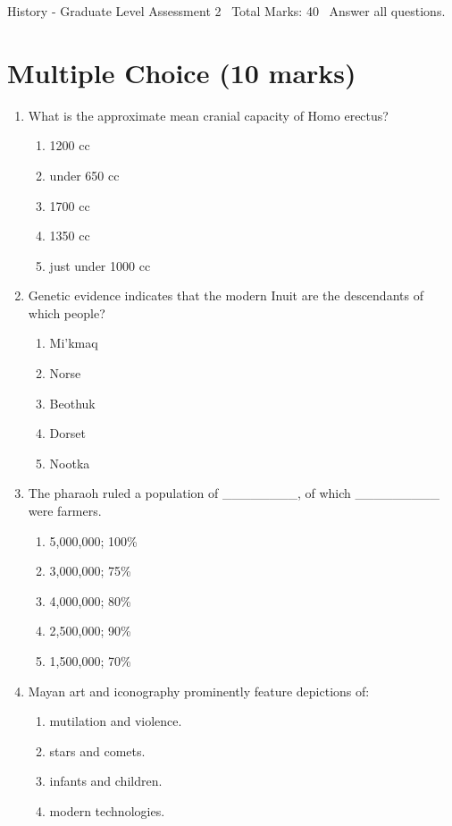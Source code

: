 \documentclass[12pt]{article}
\begin{document}
\begin{center}
History - Graduate Level Assessment 2 \
Total Marks: 40 \
Answer all questions.
\end{center}

\section*{Multiple Choice (10 marks)}
\begin{enumerate}[label=\arabic*.]
\item What is the approximate mean cranial capacity of Homo erectus?
\begin{enumerate}[label=(\alph*)]
    \item 1200 cc
    \item under 650 cc
    \item 1700 cc
    \item 1350 cc
    \item just under 1000 cc
\end{enumerate}
\item Genetic evidence indicates that the modern Inuit are the descendants of which people?
\begin{enumerate}[label=(\alph*)]
    \item Mi'kmaq
    \item Norse
    \item Beothuk
    \item Dorset
    \item Nootka
\end{enumerate}
\item The pharaoh ruled a population of \_\_\_\_\_\_\_\_, of which \_\_\_\_\_\_\_\_\_ were farmers.
\begin{enumerate}[label=(\alph*)]
    \item 5,000,000; 100\%
    \item 3,000,000; 75\%
    \item 4,000,000; 80\%
    \item 2,500,000; 90\%
    \item 1,500,000; 70\%
\end{enumerate}
\item Mayan art and iconography prominently feature depictions of:
\begin{enumerate}[label=(\alph*)]
    \item mutilation and violence.
    \item stars and comets.
    \item infants and children.
    \item modern technologies.

\end{enumerate}
\end{enumerate}
\end{document}
